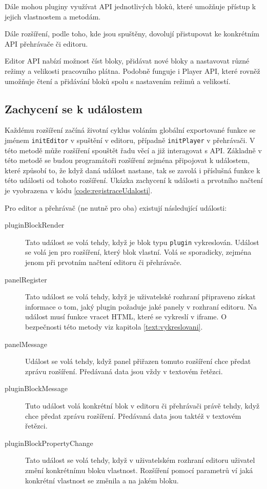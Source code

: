 Dále mohou pluginy využívat API jednotlivých bloků, které umožňuje přístup k jejich vlastnostem a metodám.

Dále rozšíření, podle toho, kde jsou spuštěny, dovolují přistupovat ke konkrétním API přehrávače či editoru.

Editor API nabízí možnost číst bloky, přidávat nové bloky a nastavovat různé režimy a velikosti pracovního plátna. Podobně funguje i Player API, které rovněž umožňuje čtení a přidávání bloků spolu s nastavením režimů a velikostí.

\subsection{Zachycení se k událostem}

Každému rozšíření začíná životní cyklus voláním globální exportované funkce se jménem \texttt{initEditor} v spuštění v editoru, případně \texttt{initPlayer} v přehrávači.
V této metodě může rozšíření spouštět řadu věcí a již interagovat s API.
Základně v této metodě se budou programátoři rozšíření zejména připojovat k událostem, které způsobí to, že když daná událost nastane, tak se zavolá i příslušná funkce k této události od tohoto rozšíření. Ukázka zachycení k události a prvotního načtení je vyobrazena v kódu \ref{code:registraceUdalosti}.

Pro editor a přehrávač (ne nutně pro oba) existují následující události:

\begin{description}
    \item[pluginBlockRender] Tato událost se volá tehdy, když je blok typu \texttt{plugin} vykreslován. Událost se volá jen pro rozšíření, který blok vlastní. Volá se sporadicky, zejména jenom při prvotním načtení editoru či přehrávače. 
    \item[panelRegister] Tato událost se volá tehdy, když je uživatelské rozhraní připraveno získat informace o tom, jaký plugin požaduje jaké panely v rozhraní editoru. Na událost musí funkce vracet HTML, které se vykreslí v iframe. O bezpečnosti této metody viz kapitola \ref{text:vykreslovani}.
    \item[panelMessage] Událost se volá tehdy, když panel přiřazen tomuto rozšíření chce předat zprávu rozšíření. Předávaná data jsou vždy v textovém řetězci.
    \item[pluginBlockMessage] Tuto událost volá konkrétní blok v editoru či přehrávači právě tehdy, když chce předat zprávu rozšíření. Předávaná data jsou taktéž v textovém řetězci.
    \item[pluginBlockPropertyChange] Tato událost se volá tehdy, když v uživatelském rozhraní editoru uživatel změní konkrétnímu bloku vlastnost. Rozšíření pomocí parametrů ví jaká konkrétní vlastnost se změnila a na jakém bloku.
\end{description}

